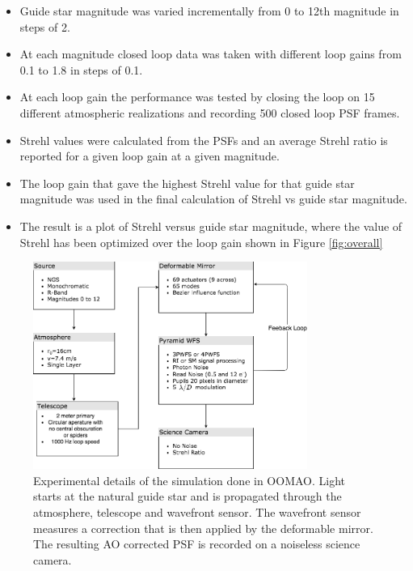 \begin{itemize}
    \item Guide star magnitude was varied incrementally from 0 to 12th magnitude in steps of 2.
    \item At each magnitude closed loop data was taken with different loop gains from 0.1 to 1.8 in steps of 0.1.
    \item At each loop gain the performance was tested by closing the loop on 15 different atmospheric realizations and recording 500 closed loop PSF frames. 
    \item Strehl values were calculated from the PSFs and an average Strehl ratio is reported for a given loop gain at a given magnitude.
    \item The loop gain that gave the highest Strehl value for that guide star magnitude was used in the final calculation of Strehl vs guide star magnitude.
    \item The result is a plot of Strehl versus guide star magnitude, where the value of Strehl has been optimized over the loop gain shown in Figure \ref{fig:overall}
\end{itemize}


\begin{figure}
    \centering
    \includegraphics[width=0.8\textwidth]{Chapter Materials/Chapter Four Materials/simulation.png}
    \caption{Experimental details of the simulation done in OOMAO. Light starts at the natural guide star and is propagated through the atmosphere, telescope and wavefront sensor. The wavefront sensor measures a correction that is then applied by the deformable mirror.  The resulting AO corrected PSF is recorded on a noiseless science camera. }
    \label{fig:simulationl}
\end{figure}

